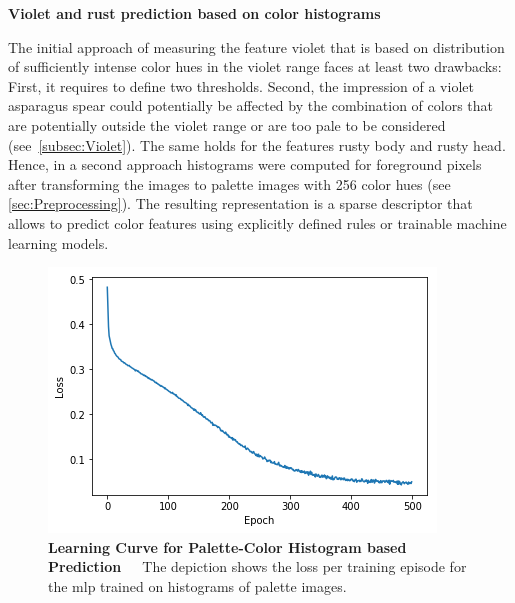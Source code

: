 \bigskip
\textbf{Violet and rust prediction based on color histograms} 

The initial approach of measuring the feature violet that is based on distribution of sufficiently intense color hues in the violet range faces at least two drawbacks: First, it requires to define two thresholds. Second, the impression of a violet asparagus spear could potentially be affected by the combination of colors that are potentially outside the violet range or are too pale to be considered (see~\autoref{subsec:Violet}). The same holds for the features rusty body and rusty head. Hence, in a second approach histograms were computed for foreground pixels after transforming the images to palette images with 256 color hues (see \autoref{sec:Preprocessing}). The resulting representation is a sparse descriptor that allows to predict color features using explicitly defined rules or trainable machine learning models.

\begin{table}[!h]
	\centering
	\caption[Feature Engineering Color-Based Prediction]{\textbf{Color-Based Prediction}~~~Performance of color histogram based predictions with a \acrshort{mlp}.}
	\label{tab:performance_color_feature_based}
\end{table} 

\begin{figure}[!htb]
	\centering
	\includegraphics[scale=0.7]{Figures/chapter04/fe_palette_color.png}
	\decoRule
	\caption[Feature Engineering Learning Curve for Color-Based Prediction]{\textbf{Learning Curve for Palette-Color Histogram based Prediction}~~~The depiction shows the loss per training episode for the \acrshort{mlp} trained on histograms of palette images.}
	\label{fig:FeatureEngineeringPaletteColor}
\end{figure}

